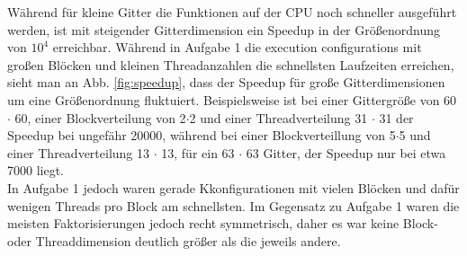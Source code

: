 \documentclass[10pt,a4paper]{article}
\begin{document}
Während für kleine Gitter die Funktionen auf der CPU noch schneller ausgeführt werden, ist mit steigender Gitterdimension ein Speedup in der Größenordnung von $10^4$ erreichbar.
Während in Aufgabe 1 die execution configurations mit großen Blöcken und kleinen Threadanzahlen die schnellsten Laufzeiten erreichen, sieht man an
Abb. \ref{fig:speedup}, dass der Speedup für große Gitterdimensionen um eine Größenordnung fluktuiert.
Beispielsweise ist bei einer Gittergröße von \num{60} $\cdot$ \num{60}, einer Blockverteilung von \num{2}$\cdot$\num{2} und einer Threadverteilung
\num{31} $\cdot$ \num{31}  der Speedup bei ungefähr \num{20000}, während bei einer Blockverteillung von \num{5}$\cdot$\num{5} und einer Threadverteilung
\num{13} $\cdot$ \num{13}, für ein \num{63} $\cdot$ \num{63} Gitter, der Speedup nur bei etwa \num{7000} liegt.\\
In Aufgabe 1 jedoch waren gerade Kkonfigurationen mit vielen Blöcken und dafür wenigen Threads pro Block am schnellsten.
Im Gegensatz zu Aufgabe 1 waren die meisten Faktorisierungen jedoch recht symmetrisch, daher es war keine Block- oder Threaddimension deutlich größer als die jeweils andere.
\end{document}

